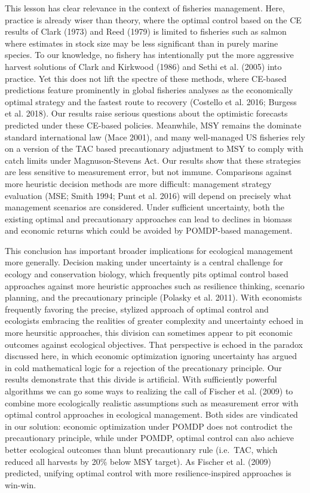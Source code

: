 \documentclass[3p]{elsarticle} %
\begin{document}
This lesson has clear relevance in the context of fisheries management.
Here, practice is already wiser than theory, where the optimal control
based on the CE results of Clark (1973) and Reed (1979) is limited to
fisheries such as salmon where estimates in stock size may be less
significant than in purely marine species. To our knowledge, no fishery
has intentionally put the more aggressive harvest solutions of Clark and
Kirkwood (1986) and Sethi et al. (2005) into practice. Yet this does not
lift the spectre of these methods, where CE-based predictions feature
prominently in global fisheries analyses as the economically optimal
strategy and the fastest route to recovery (Costello et al. 2016;
Burgess et al. 2018). Our results raise serious questions about the
optimistic forecasts predicted under these CE-based policies. Meanwhile,
MSY remains the dominate standard international law (Mace 2001), and
many well-managed US fisheries rely on a version of the TAC based
precautionary adjustment to MSY to comply with catch limits under
Magnuson-Stevens Act. Our results show that these strategies are less
sensitive to measurement error, but not immune. Comparisons against more
heuristic decision methods are more difficult: management strategy
evaluation (MSE; Smith 1994; Punt et al. 2016) will depend on precisely
what management scenarios are considered. Under sufficient uncertainty,
both the existing optimal and precautionary approaches can lead to
declines in biomass and economic returns which could be avoided by
POMDP-based management.

This conclusion has important broader implications for ecological
management more generally. Decision making under uncertainty is a
central challenge for ecology and conservation biology, which frequently
pits optimal control based approaches against more heuristic approaches
such as resilience thinking, scenario planning, and the precautionary
principle (Polasky et al. 2011). With economists frequently favoring the
precise, stylized approach of optimal control and ecologists embracing
the realities of greater complexity and uncertainty echoed in more
heursitic approaches, this division can sometimes appear to pit economic
outcomes against ecological objectives. That perspective is echoed in
the paradox discussed here, in which economic optimization ignoring
uncertainty has argued in cold mathematical logic for a rejection of the
precationary principle. Our results demonstrate that this divide is
artificial. With sufficiently powerful algorithms we can go some ways to
realizing the call of Fischer et al. (2009) to combine more ecologically
realistic assumptions such as measurement error with optimal control
approaches in ecological management. Both sides are vindicated in our
solution: economic optimization under POMDP does not controdict the
precautionary principle, while under POMDP, optimal control can also
achieve better ecological outcomes than blunt precautionary rule
(i.e.~TAC, which reduced all harvests by 20\% below MSY target). As
Fischer et al. (2009) predicted, unifying optimal control with more
resilience-inspired approaches is win-win.
\end{document}

